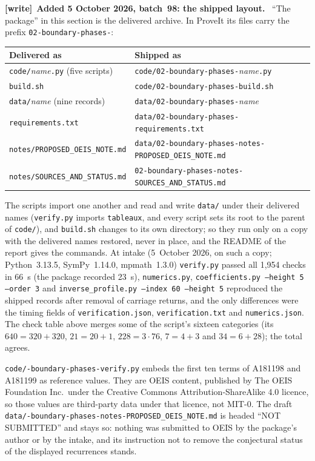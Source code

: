 \documentclass[11pt,letterpaper]{article}
\numberwithin{equation}{section}
\theoremstyle{definition}
\newcommand{\1}{\mathbf 1}
\newenvironment{writenote}[1][]{\par\smallskip\begingroup\small
 \noindent\textbf{[write]}\if\relax\detokenize{#1}\relax\else~\textbf{#1.}\fi\ }%
 {\par\endgroup\smallskip}
\begin{document}
\begin{writenote}[Added 5 October 2026, batch~98: the shipped layout]
``The package'' in this section is the delivered archive. In ProveIt its
files carry the prefix \texttt{02-boundary-phases-}:
\begin{center}\footnotesize
\begin{tabular}{@{}ll@{}}
\toprule
Delivered as & Shipped as\\
\midrule
\texttt{code/}\emph{name}\texttt{.py} (five scripts) & \texttt{code/02-boundary-phases-}\emph{name}\texttt{.py}\\
\texttt{build.sh} & \texttt{code/02-boundary-phases-build.sh}\\
\texttt{data/}\emph{name} (nine records) & \texttt{data/02-boundary-phases-}\emph{name}\\
\texttt{requirements.txt} & \texttt{data/02-boundary-phases-requirements.txt}\\
\texttt{notes/PROPOSED\_OEIS\_NOTE.md} & \texttt{data/02-boundary-phases-notes-PROPOSED\_OEIS\_NOTE.md}\\
\texttt{notes/SOURCES\_AND\_STATUS.md} & \texttt{02-boundary-phases-notes-SOURCES\_AND\_STATUS.md}\\
\bottomrule
\end{tabular}
\end{center}
The scripts import one another and read and write \texttt{data/} under
their delivered names (\texttt{verify.py} imports \texttt{tableaux}, and
every script sets its root to the parent of \texttt{code/}), and
\texttt{build.sh} changes to its own directory; so they run only on a copy
with the delivered names restored, never in place, and the README of the
report gives the commands. At intake (5~October 2026, on such a copy;
Python~3.13.5, SymPy~1.14.0, mpmath~1.3.0) \texttt{verify.py} passed all
1{,}954 checks in 66~s (the package recorded 23~s), \texttt{numerics.py},
\texttt{coefficients.py --height 5 --order 3} and
\texttt{inverse\_profile.py --index 60 --height 5} reproduced the shipped
records after removal of carriage returns, and the only differences were
the timing fields of \texttt{verification.json}, \texttt{verification.txt}
and \texttt{numerics.json}. The check table above merges some of the
script's sixteen categories (its $640=320+320$, $21=20+1$, $228=3\cdot76$,
$7=4+3$ and $34=6+28$); the total agrees.

\texttt{code/-boundary-phases-verify.py} embeds the first ten
terms of A181198 and A181199 as reference values. They are OEIS content,
published by The OEIS Foundation Inc.\ under the Creative Commons
Attribution-ShareAlike 4.0 licence, so those values are third-party data
under that licence, not MIT-0. The draft
\texttt{data/-boundary-phases-notes-PROPOSED\_OEIS\_NOTE.md}
is headed ``NOT SUBMITTED'' and stays so: nothing was submitted to OEIS by
the package's author or by the intake, and its instruction not to remove
the conjectural status of the displayed recurrences stands.
\end{writenote}
\end{document}

